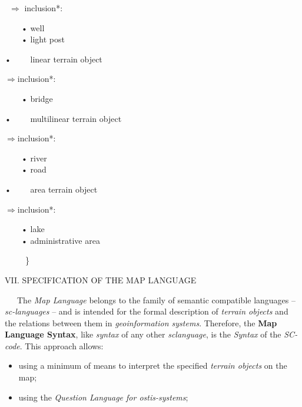 \documentclass{article}
\begin{document}
\begin{multicols}{2}
\begin{adjustwidth}{15mm}{}
\begin{itemize}
\begin{itemize}
        \ \(\Rightarrow\) inclusion*:\\
        \begin{itemize}
     \ \ \ \ • well\\
       \ \ \ \      • light post
        \end{itemize}
    \end{itemize}
    • \ \ \ \ linear terrain object
    \begin{itemize}
         \(\Rightarrow\)inclusion*:\\
        \begin{itemize}
            \ \ \ \ • bridge
        \end{itemize}
    \end{itemize}
    • \ \ \ \ multilinear terrain object
    \begin{itemize}
         \(\Rightarrow\)inclusion*:\\
        \begin{itemize}
        \ \ \ \  • river\\
        \ \ \ \ • road
        \end{itemize}
    \end{itemize}
    • \ \ \ \ area terrain object
    \begin{itemize}
         \(\Rightarrow\)inclusion*:\\
        \begin{itemize}
           \ \ \ \  • lake\\
          \ \ \ \  • administrative area
        \end{itemize}
    \end{itemize}
\end{itemize}
\ \ \ \ \ \}
\end{adjustwidth}
\begin{center}
 VII. SPECIFICATION OF THE MAP LANGUAGE
 \end{center}
\ \ \ The \textit{Map Language} belongs to the family of semantic
compatible languages – \textit{sc-languages} – and is intended for
the formal description of \textit{terrain objects} and the relations
between them in \textit{geoinformation systems}. Therefore, the
\textbf{Map Language Syntax}, like \textit{syntax} of any other \textit{sclanguage}, is the \textit{Syntax} of the \textit{SC-code}. This approach
allows:
	\begin{itemize}
		\item using a minimum of means to interpret the specified
\textit{terrain objects} on the map;

		\item using the \textit{Question Language for ostis-systems};
	

\end{itemize}
\end{multicols}
\end{document}
